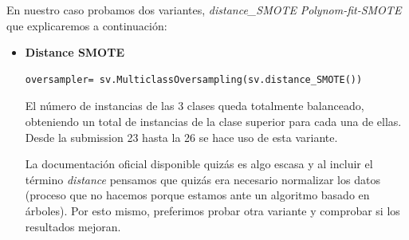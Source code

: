 \begin{itemize}
	En nuestro caso probamos dos variantes, \textit{distance\_SMOTE} \textit{Polynom-fit-SMOTE} que explicaremos a continuación:
	
	\newpage
	
	\begin{itemize}
		\item \textbf{Distance SMOTE}
		\begin{lstlisting}[frame=single]
oversampler= sv.MulticlassOversampling(sv.distance_SMOTE())
		\end{lstlisting}
		
		El número de instancias de las 3 clases queda totalmente balanceado, obteniendo un total de instancias de la clase superior para cada una de ellas. Desde la submission 23 hasta la 26 se hace uso de esta variante. 
		
		
		\begin{figure}[H]
			\centering
		\end{figure}
	
	
	La documentación oficial disponible quizás es algo escasa y al incluir el término \textit{distance} pensamos que quizás era necesario normalizar los datos (proceso que no hacemos porque estamos ante un algoritmo basado en árboles). Por esto mismo, preferimos probar otra variante y comprobar si los resultados mejoran. \\
		

\end{itemize}
\end{itemize}
